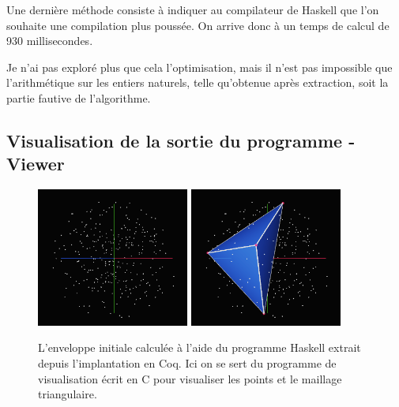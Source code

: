 \documentclass[]{article}
\begin{document}
Une dernière méthode consiste à indiquer au compilateur de Haskell que l'on souhaite une compilation plus poussée. On arrive donc à un temps de calcul de 930 millisecondes.

Je n'ai pas exploré plus que cela l'optimisation, mais il n'est pas impossible que l'arithmétique sur les entiers naturels, telle qu'obtenue après extraction, soit la partie fautive de l'algorithme.

\subsection{Visualisation de la sortie du programme - Viewer}

\begin{figure}[H]
	\begin{center}
		\includegraphics[width=5cm]{viewer/screen0.png}
		\includegraphics[width=5cm]{viewer/screen1.png}
	\end{center}
	\caption{L'enveloppe initiale calculée à l'aide du programme Haskell extrait depuis l'implantation en Coq. Ici on se sert du programme de visualisation écrit en C pour visualiser les points et le maillage triangulaire.}
\end{figure}
\end{document}
